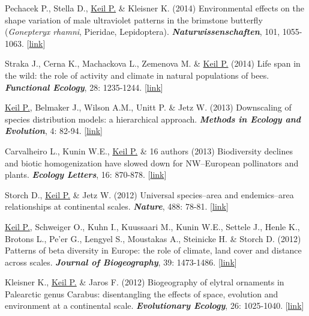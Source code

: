 \begin{etaremune}
\item Pechacek P., Stella D., \underline{Keil P.} \& Kleisner K. (2014) Environmental effects on the shape variation of male ultraviolet patterns in the brimstone butterfly (\textit{Gonepteryx rhamni}, Pieridae, Lepidoptera). \textit{\textbf{Naturwissenschaften}}, 101, 1055-1063.  [\href{http://link.springer.com/article/10.1007/s00114-014-1244-5}{link}] 

\item Straka J., Cerna K., Machackova L., Zemenova M. \& \underline{Keil P.} (2014) Life span in the wild: the role of activity and climate in natural populations of bees. \textit{\textbf{Functional Ecology}}, 28: 1235-1244.
[\href{http://onlinelibrary.wiley.com/doi/10.1111/1365-2435.12261/abstract}{link}]

\item \underline{Keil P.}, Belmaker J., Wilson A.M., Unitt P. \& Jetz W. (2013) Downscaling of species distribution models: a hierarchical approach. \textit{\textbf{Methods in Ecology and Evolution}}, 4: 82-94. [\href{http://onlinelibrary.wiley.com/doi/10.1111/j.2041-210x.2012.00264.x/abstract}{link}]

\item Carvalheiro L., Kunin W.E., \underline{Keil P.} \& 16 authors (2013) Biodiversity declines and biotic homogenization have slowed down for NW--European pollinators and plants. \textit{\textbf{Ecology Letters}}, 16: 870-878. [\href{http://onlinelibrary.wiley.com/doi/10.1111/ele.12121/abstract}{link}]

\item Storch D., \underline{Keil P.} \& Jetz W. (2012) Universal species--area and endemics--area relationships at continental scales. \textit{\textbf{Nature}}, 488: 78-81. [\href{http://www.nature.com/nature/journal/v488/n7409/full/nature11226.html}{link}]

\item \underline{Keil P.}, Schweiger O., Kuhn I., Kuussaari M., Kunin W.E., Settele J., Henle K., Brotons L., Pe’er G., Lengyel S., Moustakas A., Steinicke H. \& Storch D. (2012) Patterns of beta diversity in Europe: the role of climate, land cover and distance across scales. \textit{\textbf{Journal of Biogeography}}, 39: 1473-1486. [\href{http://onlinelibrary.wiley.com/doi/10.1111/j.1365-2699.2012.02701.x/abstract}{link}]

\item Kleisner K., \underline{Keil P.} \& Jaros F. (2012) Biogeography of elytral ornaments in Palearctic genus Carabus: disentangling the effects of space, evolution and environment at a continental scale. \textit{\textbf{Evolutionary Ecology}}, 26: 1025-1040. [\href{http://link.springer.com/article/10.1007%2Fs10682-011-9537-z}{link}]


\end{etaremune}
